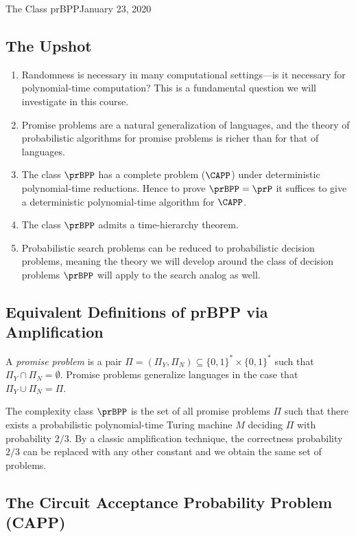 \begin{lecture}{1}{The Class prBPP}{January 23, 2020}
\label{lec:01}

\subsection*{The Upshot}

\begin{enumerate}
  \item Randomness is necessary in many computational settings---is it
    necessary for polynomial-time computation? This is a fundamental question
    we will investigate in this course.
  \item Promise problems are a natural generalization of languages, and the
    theory of probabilistic algorithms for promise problems is richer than
    for that of languages.
  \item The class $\prBPP$ has a complete problem ($\CAPP$) under deterministic
    polynomial-time reductions. Hence to prove $\prBPP = \prP$ it suffices
    to give a deterministic polynomial-time algorithm for $\CAPP$.
  \item The class $\prBPP$ admits a time-hierarchy theorem.
  \item Probabilistic search problems can be reduced to probabilistic decision
    problems, meaning the theory we will develop around the class of decision
    problems $\prBPP$ will apply to the search analog as well.
\end{enumerate}

\subsection{Equivalent Definitions of prBPP via Amplification}

A \emph{promise problem} is a pair $\Pi = (\Pi_Y, \Pi_N) \subseteq \{0, 1\}^*
\times \{0, 1\}^*$ such that $\Pi_Y \cap \Pi_N = \emptyset$. Promise problems
generalize languages in the case that $\Pi_Y \cup \Pi_N = \Pi$.

The complexity class $\prBPP$ is the set of all promise problems $\Pi$ such
that there exists a probabilistic polynomial-time Turing machine $M$ deciding
$\Pi$ with probability $2/3$. By a classic amplification technique, the
correctness probability $2/3$ can be replaced with any other constant and we
obtain the same set of problems.

\subsection{The Circuit Acceptance Probability Problem (CAPP)}


\end{lecture}
